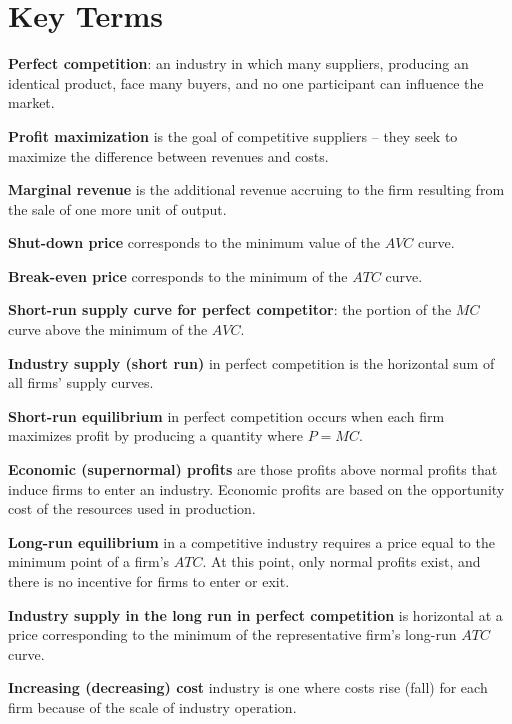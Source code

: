\newpage
	\section*{Key Terms}
\begin{keyterms}
\textbf{Perfect competition}: an industry in which many suppliers, producing an identical product, face many buyers, and no one participant can influence the market.

\textbf{Profit maximization} is the goal of competitive suppliers -- they seek to maximize the difference between revenues and costs.

\textbf{Marginal revenue} is the additional revenue accruing to the firm resulting from the sale of one more unit of output.

\textbf{Shut-down price} corresponds to the minimum value of the $AVC$ curve.

\textbf{Break-even price} corresponds to the minimum of the $ATC$ curve.

\textbf{Short-run supply curve for perfect competitor}: the portion of the $MC$ curve above the minimum of the $AVC$.

\textbf{Industry supply (short run)} in perfect competition is the horizontal sum of all firms' supply curves.

\textbf{Short-run equilibrium} in perfect competition occurs when each firm maximizes profit by producing a quantity where $P=MC$.

\textbf{Economic (supernormal) profits} are those profits above normal profits that induce firms to enter an industry. Economic profits are based on the opportunity cost of the resources used in production.

\textbf{Long-run equilibrium} in a competitive industry requires a price equal to the minimum point of a firm's $ATC$. At this point, only normal profits exist, and there is no incentive for firms to enter or exit.

\textbf{Industry supply in the long run in perfect competition} is horizontal at a price corresponding to the minimum of the representative firm's long-run $ATC$ curve.

\textbf{Increasing (decreasing) cost} industry is one where costs rise (fall) for each firm because of the scale of industry operation.
\end{keyterms}